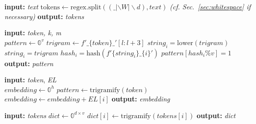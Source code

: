 \documentclass[11pt]{article}
\begin{document}
\begin{algorithm}[h]
\caption{token\_split}\label{alg:split}\label{alg:mesa_algo}\label{alg:mesa_algo_decode}
\begin{algorithmic}
\State \textbf{input:} \emph{text} \vspace{4px}
\State $\textrm{tokens}\gets \textrm{regex.split}((\_|\backslash W|\backslash d), text)$
\State \emph{(cf. Sec.~\ref{sec:whitespace} if necessary)}\vspace{4px}
\State \textbf{output:} \emph{tokens}
\end{algorithmic}
\end{algorithm}

\begin{algorithm}[h]
\caption{trigramify}\label{alg:trigramify}\label{alg:mesa_algo}\label{alg:mesa_algo_decode}
\begin{algorithmic}
\State \textbf{input:} \emph{token, k, m} \\
 \vspace{4px}
\State $pattern \gets \mathbb{0}^{v}$
\State $trigram \gets f'\_\{token\}\_'[l:l+3]$
\State $string_i = \textrm{lower}(trigram)$
\Else
\State $string_i = trigram$
\EndIf
\State $hash_i = \textrm{hash}(f'\{string_i\}\_\{i\}')$
\State $pattern[hash_i\%v] = 1$
\EndFor\vspace{4px}
\EndFor\vspace{4px}
\State \textbf{output:} \emph{pattern}
\end{algorithmic}
\end{algorithm}

\begin{algorithm}[h]
\caption{encode}\label{alg:encode}
\begin{algorithmic}
\State \textbf{input:} \emph{token}, \emph{EL}\\
\vspace{4px}
\State $embedding \gets \mathbb{0}^{h}$
\State $pattern \gets \textrm{trigramify}(token)$
\State $embedding \gets embedding+EL[i]$
\EndIf
\EndFor
\State \textbf{output:} \emph{embedding}
\end{algorithmic}
\end{algorithm}

\begin{algorithm}[h]
\caption{compile\_dictionary}\label{alg:dict}
\begin{algorithmic}
\State \textbf{input:} \emph{tokens}\vspace{4px}
\State $dict \gets \mathbb{0}^{d\times v}$
\State $dict[i] \gets \textrm{trigramify}(tokens[i])$
\EndFor
\State \textbf{output:} \emph{dict}
\end{algorithmic}
\end{algorithm}
\end{document}
